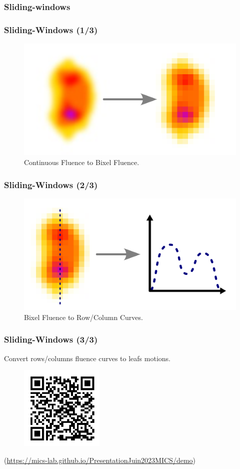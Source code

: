 \documentclass{beamer}
\begin{document}
	\subsubsection{Sliding-windows}
	\begin{frame}
		\frametitle{Sliding-Windows (1/3)}
		\begin{figure}
			\includegraphics[width=\linewidth]{vector_images/fluence_bixelization.pdf}
			\caption{Continuous Fluence to Bixel Fluence.}
		\end{figure}
	\end{frame}
	\begin{frame}
		\frametitle{Sliding-Windows (2/3)}
		\begin{figure}
			\includegraphics[width=\linewidth]{vector_images/sliding_window_curve.pdf}
			\caption{Bixel Fluence to Row/Column Curves.}
		\end{figure}
	\end{frame}
	\begin{frame}
	\frametitle{Sliding-Windows (3/3)}
	Convert rows/columns fluence curves to leafs motions.
	\begin{figure}
		\includegraphics[height=4cm]{matrix_images/demo_QR_code.png}
	\end{figure}
	{\small (\url{https://mics-lab.github.io/PresentationJuin2023MICS/demo})}
	\end{frame}
	
\end{document}
